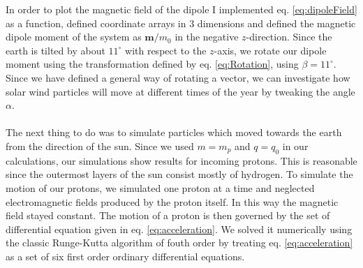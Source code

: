 \noindent In order to plot the magnetic field of the dipole I implemented eq. \ref{eq:dipoleField} as a function, defined coordinate arrays in 3 dimensions and defined the magnetic dipole moment of the system as $\boldsymbol{m}/m_0$ in the negative $z$-direction. Since the earth is tilted by about $11^{\circ}$ with respect to the $z$-axis, we rotate our dipole moment using the transformation defined by eq. \ref{eq:Rotation}, using $\beta=11^{\circ}$. Since we have defined a general way of rotating a vector, we can investigate how solar wind particles will move at different times of the year by tweaking the angle $\alpha$.\\
\\
The next thing to do was to simulate particles which moved towards the earth from the direction of the sun. Since we used $m=m_p$ and $q=q_0$ in our calculations, our simulations show results for incoming protons. This is reasonable since the outermost layers of the sun consist mostly of hydrogen. To simulate the motion of our protons, we simulated one proton at a time and neglected electromagnetic fields produced by the proton itself. In this way the magnetic field stayed constant. The motion of a proton is then governed by the set of differential equation given in eq. \ref{eq:acceleration}. We solved it numerically using the classic Runge-Kutta algorithm of fouth order by treating eq. \ref{eq:acceleration} as a set of six first order ordinary differential equations.